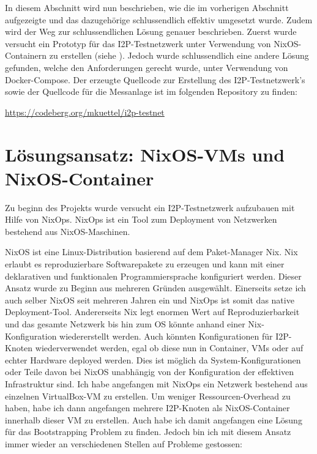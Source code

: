 In diesem Abschnitt wird nun beschrieben,
wie die im vorherigen Abschnitt aufgezeigte  und das dazugehörige  schlussendlich effektiv umgesetzt wurde.
Zudem wird der Weg zur schlussendlichen Lösung genauer beschrieben.
Zuerst wurde versucht ein Prototyp für das I2P-Testnetzwerk unter Verwendung von NixOS-Containern zu erstellen (siehe ).
Jedoch wurde schlussendlich eine andere Lösung gefunden, welche den Anforderungen gerecht wurde, unter Verwendung von Docker-Compose.
Der erzeugte Quellcode zur Erstellung des I2P-Testnetzwerk's sowie der Quellcode für die Messanlage ist im folgenden Repository zu finden:

\url{https://codeberg.org/mkuettel/i2p-testnet}

\section{Lösungsansatz: NixOS-VMs und NixOS-Container}\label{sec:la1_nixos}

Zu beginn des Projekts wurde versucht ein I2P-Testnetzwerk aufzubauen mit Hilfe von NixOps.
NixOps ist ein Tool zum Deployment von Netzwerken bestehend aus NixOS-Maschinen.
\cite{noauthor_nixops_nodate-5}

NixOS ist eine Linux-Distribution basierend auf dem Paket-Manager Nix.
Nix erlaubt es reproduzierbare Softwarepakete zu erzeugen und kann mit einer deklarativen und funktionalen Programmiersprache konfiguriert werden.
Dieser Ansatz wurde zu Beginn aus mehreren Gründen ausgewählt.
Einerseits setze ich auch selber NixOS seit mehreren Jahren ein und NixOps ist somit das native Deployment-Tool.
Andererseits Nix legt enormen Wert auf Reproduzierbarkeit und das gesamte Netzwerk bis hin zum OS könnte anhand einer Nix-Konfiguration wiedererstellt werden.
Auch könnten Konfigurationen für I2P-Knoten wiederverwendet werden, egal ob diese nun in Container,
VMs oder auf echter Hardware deployed werden.
Dies ist möglich da System-Konfigurationen oder Teile davon bei NixOS unabhängig von der Konfiguration der effektiven Infrastruktur sind.
Ich habe angefangen mit NixOps ein Netzwerk bestehend aus einzelnen VirtualBox-VM zu erstellen.
Um weniger Ressourcen-Overhead zu haben, habe ich dann angefangen mehrere I2P-Knoten als NixOS-Container innerhalb dieser VM zu erstellen.
Auch habe ich damit angefangen eine Lösung für das Bootstrapping Problem zu finden.
Jedoch bin ich mit diesem Ansatz immer wieder an verschiedenen Stellen auf Probleme gestossen:

